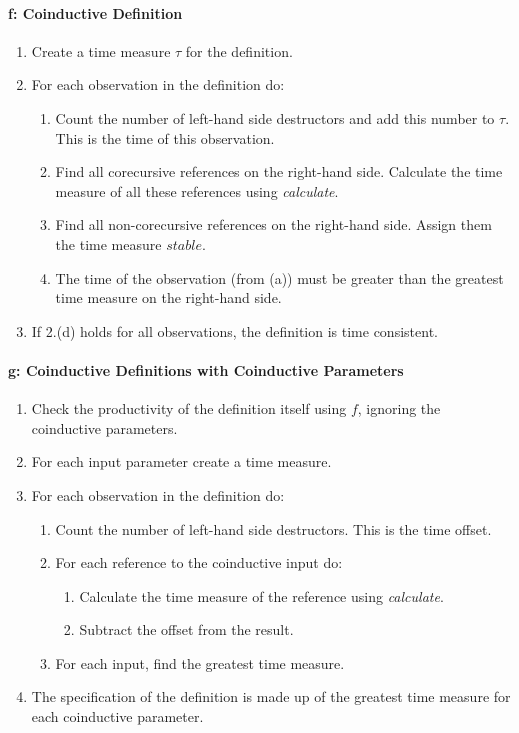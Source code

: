 \paragraph{f: Coinductive Definition}
\begin{enumerate}
\item Create a time measure $\tau$ for the definition.
\item For each observation in the definition do:
\begin{enumerate}
\item Count the number of left-hand side destructors and add this number to $\tau$. This is the time of this observation. 
\item Find all corecursive references on the right-hand side. Calculate the time measure of all these references using \textit{calculate}.
\item Find all non-corecursive references on the right-hand side. Assign them the time measure $stable$.
\item The time of the observation (from (a)) must be greater than the greatest time measure on the right-hand side.
\end{enumerate}
\item If 2.(d) holds for all observations, the definition is time consistent.
\end{enumerate}

\paragraph{g: Coinductive Definitions with Coinductive Parameters}
\begin{enumerate}
\item Check the productivity of the definition itself using $f$, ignoring the coinductive parameters.
\item For each input parameter create a time measure.
\item For each observation in the definition do:
\begin{enumerate}
\item Count the number of left-hand side destructors. This is the time offset.
\item For each reference to the coinductive input do:
\begin{enumerate}
\item Calculate the time measure of the reference using \textit{calculate}.
\item Subtract the offset from the result.
\end{enumerate}
\item For each input, find the greatest time measure.
\end{enumerate}
\item The specification of the definition is made up of the greatest time measure for each coinductive parameter.
\end{enumerate}
